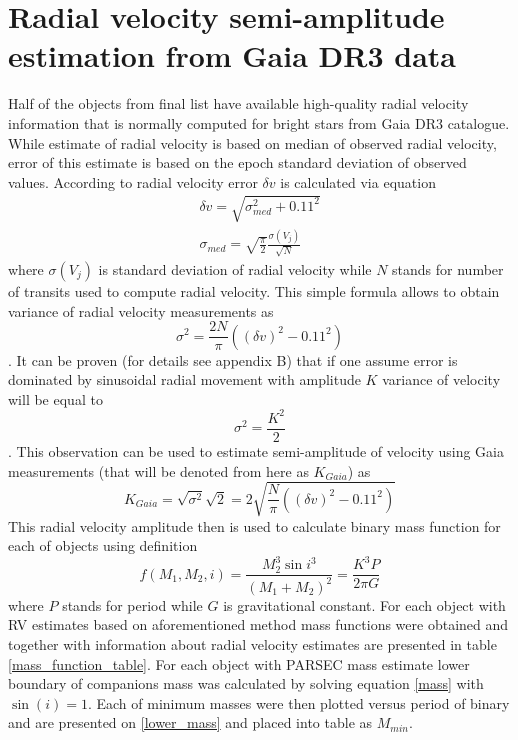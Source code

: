 \documentclass{pracalicmgr}
\begin{document}
\section{Radial velocity semi-amplitude estimation from Gaia DR3 data}
Half of the objects from final list have available high-quality radial velocity information that is normally computed for bright stars from Gaia DR3 catalogue. While estimate of radial velocity 
is based on median of observed radial velocity, error of this estimate is based on the epoch standard deviation of observed values. According to \citep{katz_gaia_2022} radial velocity error $\delta v$ 
is calculated via equation
\begin{align}
    \delta v=\sqrt{\sigma_{med}^2+0.11^2}\\
    \sigma_{med}=\sqrt{\frac{\pi}{2}}\frac{\sigma(V_j)}{\sqrt{N}}
\end{align}
where $\sigma(V_j)$ is standard deviation of radial velocity while $N$ stands for number of transits used to compute radial velocity. This simple formula allows to obtain variance of 
radial velocity measurements as 
\begin{equation}
    \sigma^2=\frac{2N}{\pi}\left((\delta v)^2-0.11^2\right)
\end{equation}
. It can be proven (for details see appendix B) that if one assume error is dominated by sinusoidal radial movement with amplitude $K$ 
variance of velocity will be equal to
\begin{equation}
    \sigma^2=\frac{K^2}{2}
\end{equation}.
This observation can be used to estimate semi-amplitude of velocity using Gaia measurements (that will be denoted from here as $K_{Gaia}$) as 
\begin{equation}
    K_{Gaia}=\sqrt{\sigma^2}\sqrt{2}=2\sqrt{\frac{N}{\pi}\left((\delta v)^2-0.11^2\right)}
\end{equation}
This radial velocity amplitude then is used to calculate binary mass function for each of objects using definition 
\begin{equation}\label{mass}
    f(M_1,M_2,i)=\frac{M_2^3 \sin{i}^3}{(M_1+M_2)^2}=\frac{K^3 P}{2\pi G}
\end{equation}
where $P$ stands for period while $G$ is gravitational constant. For each object with RV estimates based on aforementioned method mass functions were obtained and together with
information about radial velocity estimates are presented in table \ref{mass_function_table}.
For each object with PARSEC mass estimate lower boundary of companions mass was calculated by solving equation \ref{mass}
with  $\sin{(i)}=1$. Each of minimum masses were then plotted versus period of binary and are presented on \ref{lower_mass}
and placed into table as $M_{min}$.
\end{document}
